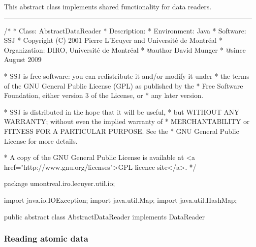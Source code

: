 
This abstract class implements shared functionality for data readers.

\bigskip\hrule

\begin{code}\begin{hide}
/*
 * Class:        AbstractDataReader
 * Description:  
 * Environment:  Java
 * Software:     SSJ 
 * Copyright (C) 2001  Pierre L'Ecuyer and Université de Montréal
 * Organization: DIRO, Université de Montréal
 * @author       David Munger 
 * @since        August 2009

 * SSJ is free software: you can redistribute it and/or modify it under
 * the terms of the GNU General Public License (GPL) as published by the
 * Free Software Foundation, either version 3 of the License, or
 * any later version.

 * SSJ is distributed in the hope that it will be useful,
 * but WITHOUT ANY WARRANTY; without even the implied warranty of
 * MERCHANTABILITY or FITNESS FOR A PARTICULAR PURPOSE.  See the
 * GNU General Public License for more details.

 * A copy of the GNU General Public License is available at
   <a href="http://www.gnu.org/licenses">GPL licence site</a>.
 */
\end{hide}
package umontreal.iro.lecuyer.util.io;
\begin{hide}
import java.io.IOException;
import java.util.Map;
import java.util.HashMap;
\end{hide}

public abstract class AbstractDataReader implements DataReader \begin{hide} {
\end{hide}
\end{code}

\subsubsection*{Reading atomic data}


